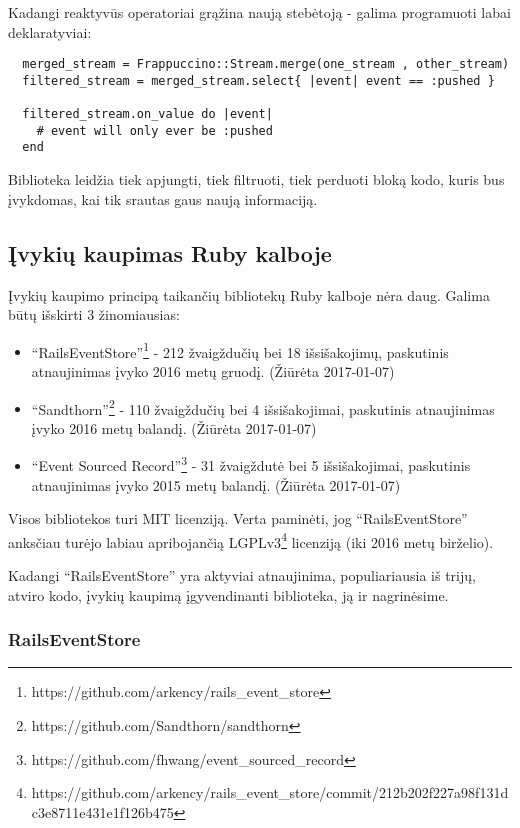 Kadangi reaktyvūs operatoriai grąžina naują stebėtoją - galima programuoti labai deklaratyviai:

\begin{lstlisting}
  merged_stream = Frappuccino::Stream.merge(one_stream , other_stream)
  filtered_stream = merged_stream.select{ |event| event == :pushed }

  filtered_stream.on_value do |event|
    # event will only ever be :pushed
  end
\end{lstlisting}

Biblioteka leidžia tiek apjungti, tiek filtruoti, tiek perduoti bloką kodo, kuris bus įvykdomas, kai tik srautas gaus naują informaciją.

\subsection{Įvykių kaupimas Ruby kalboje}

Įvykių kaupimo principą taikančių bibliotekų Ruby kalboje nėra daug. Galima būtų išskirti 3 žinomiausias:

\begin{itemize}
  \item ``RailsEventStore''\footnote{https://github.com/arkency/rails\_event\_store} - 212 žvaigždučių bei 18 išsišakojimų, paskutinis atnaujinimas įvyko 2016 metų gruodį. (Žiūrėta 2017-01-07)

  \item ``Sandthorn''\footnote{https://github.com/Sandthorn/sandthorn} - 110 žvaigždučių bei 4 išsišakojimai, paskutinis atnaujinimas įvyko 2016 metų balandį. (Žiūrėta 2017-01-07)

  \item ``Event Sourced Record''\footnote{https://github.com/fhwang/event\_sourced\_record} - 31 žvaigždutė bei 5 išsišakojimai, paskutinis atnaujinimas įvyko 2015 metų balandį. (Žiūrėta 2017-01-07)
\end{itemize}

Visos bibliotekos turi MIT licenziją. Verta paminėti, jog ``RailsEventStore'' anksčiau turėjo labiau apribojančią LGPLv3\footnote{https://github.com/arkency/rails\_event\_store/commit/212b202f227a98f131dc3e8711e431e1f126b475} licenziją (iki 2016 metų birželio).

Kadangi ``RailsEventStore'' yra aktyviai atnaujinima, populiariausia iš trijų, atviro kodo, įvykių kaupimą įgyvendinanti biblioteka, ją ir nagrinėsime.

\subsubsection{RailsEventStore}

